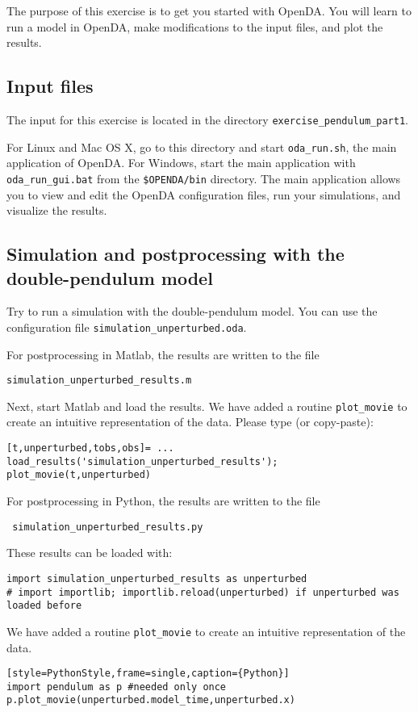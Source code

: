 The purpose of this exercise is to get you started with OpenDA. You will learn
to run a model in OpenDA, make modifications to the input files, and plot the
results.
\subsection{Input files}
The input for this exercise is located in the directory \lstinline{exercise_pendulum_part1}. 

For Linux and Mac OS X, go to this directory and start \lstinline{oda_run.sh}, the
main application of OpenDA. For Windows, start the main application with 
\lstinline{oda_run_gui.bat} from the \lstinline{$OPENDA/bin} directory. The main 
application allows you to view and edit the OpenDA configuration files, run your
simulations, and visualize the results.

\subsection{Simulation and postprocessing with the double-pen\-du\-lum model}
Try to run a simulation with the double-pendulum model. You can use the configuration file \lstinline{simulation_unperturbed.oda}. 

\ifshowmatlab
      For postprocessing in Matlab, the results are written to the file
      \begin{center}
        \lstinline{simulation_unperturbed_results.m}
      \end{center}
      Next, start Matlab and load the results. We have added a routine \lstinline{plot_movie} to create an intuitive
      representation of the data. Please type (or copy-paste):
      \begin{lstlisting}[style=MatlabStyle,caption={Matlab}]
[t,unperturbed,tobs,obs]= ...
load_results('simulation_unperturbed_results');
plot_movie(t,unperturbed)\end{lstlisting}
\fi
      
For postprocessing in Python, the results are written to the file
\begin{center}
  \texttt{ simulation\_unperturbed\_results.py}
\end{center}
      
      
These results can be loaded with:
\begin{lstlisting}[style=PythonStyle, caption={Python initialize}]
import simulation_unperturbed_results as unperturbed
# import importlib; importlib.reload(unperturbed) if unperturbed was loaded before\end{lstlisting}
      We have added a routine \lstinline{plot_movie} to create an intuitive
      representation of the data. 
\begin{lstlisting}[style=PythonStyle, caption={Python}][style=PythonStyle,frame=single,caption={Python}]
import pendulum as p #needed only once
p.plot_movie(unperturbed.model_time,unperturbed.x)\end{lstlisting}
      
